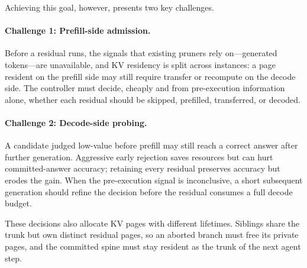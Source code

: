 Achieving this goal, however, presents two key challenges.

\paragraph{Challenge 1: Prefill-side admission.}
Before a residual runs, the signals that existing pruners rely on---generated tokens---are unavailable, and KV residency is split across instances: a page resident on the prefill side may still require transfer or recompute on the decode side.
The controller must decide, cheaply and from pre-execution information alone, whether each residual should be skipped, prefilled, transferred, or decoded.

\paragraph{Challenge 2: Decode-side probing.}
A candidate judged low-value before prefill may still reach a correct answer after further generation.
Aggressive early rejection saves resources but can hurt committed-answer accuracy; retaining every residual preserves accuracy but erodes the gain.
When the pre-execution signal is inconclusive, a short subsequent generation should refine the decision before the residual consumes a full decode budget.

These decisions also allocate KV pages with different lifetimes.
Siblings share the trunk but own distinct residual pages, so an aborted branch must free its private pages, and the committed spine must stay resident as the trunk of the next agent step.

